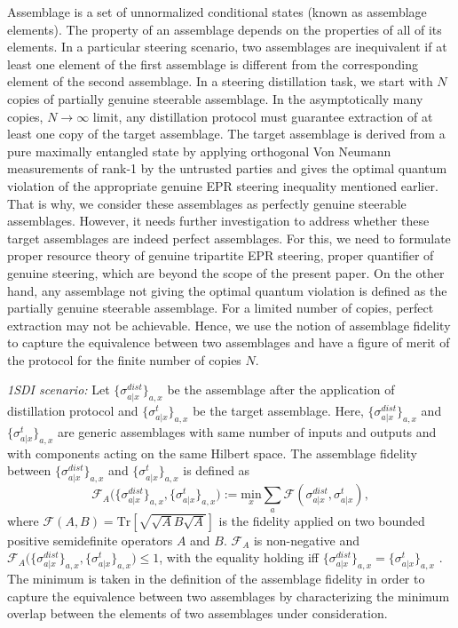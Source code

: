 \documentclass[reprint,superscriptaddress,nofootinbib,amsmath,amssymb,aps,pra,longbibliography]{revtex4-1}
\begin{document}
Assemblage is a set of unnormalized conditional states (known as assemblage elements). The property of an assemblage depends on the properties of all of its elements. In a particular steering scenario, two assemblages are inequivalent if at least one element of the first assemblage is different from the corresponding element of the second assemblage. In a steering distillation task, we start with $N$ copies of partially genuine steerable assemblage. In the asymptotically many copies, $N \rightarrow \infty$ limit, any distillation protocol must guarantee extraction of at least one copy of the target assemblage. The target assemblage is derived from a pure maximally entangled state by applying orthogonal Von Neumann measurements of rank-1 by the untrusted parties and gives the optimal quantum violation of the appropriate genuine EPR steering inequality mentioned earlier. That is why, we consider these assemblages as perfectly genuine steerable assemblages. However, it needs further investigation to address whether these target assemblages are indeed perfect assemblages. For this, we need to formulate proper resource theory of genuine tripartite EPR steering, proper quantifier of genuine steering, which are beyond the scope of the present paper. On the other hand, any assemblage not giving the optimal quantum violation is defined as the partially genuine steerable assemblage. For a limited number of copies, perfect extraction may not be achievable. Hence, we use the notion of assemblage fidelity \cite{Nery20} to capture the equivalence between two assemblages and have a figure of merit of the protocol for the finite number of copies $N$. 

\textit{1SDI scenario:} Let $\{\sigma_{a|x}^{dist} \}_{a,x}$ be the assemblage after the application of distillation protocol and  $\{\sigma_{a|x}^{t} \}_{a,x}$ be the target assemblage. Here, $\{\sigma_{a|x}^{dist} \}_{a,x}$ and $\{\sigma_{a|x}^{t} \}_{a,x}$ are generic assemblages with same number of inputs and outputs and with components acting on the same Hilbert space. The assemblage fidelity between $\{\sigma_{a|x}^{dist} \}_{a,x}$ and $\{\sigma_{a|x}^{t} \}_{a,x}$ is defined as \cite{Nery20}
\begin{equation}
	\mathcal{F}_A \Big(\{\sigma_{a|x}^{dist} \}_{a,x} , \{\sigma_{a|x}^{t} \}_{a,x} \Big):= \underset{x}{\mathrm{min}}\sum_{a} \mathcal{F}(\sigma_{a|x}^{dist}, \sigma_{a|x}^{t}) ,
\end{equation}
where $\mathcal{F}(A ,B) = \text{Tr}[\sqrt{\sqrt{A}B \sqrt{A}}]$ is the fidelity applied on two bounded positive semidefinite operators $A$ and $B$. $\mathcal{F}_A$ is non-negative and $\mathcal{F}_A \Big(\{\sigma_{a|x}^{dist} \}_{a,x} , \{\sigma_{a|x}^{t} \}_{a,x} \Big) \leq 1$, with the equality holding iff $\{\sigma_{a|x}^{dist} \}_{a,x} = \{\sigma_{a|x}^{t} \}_{a,x}$ \cite{Nery20}.  The minimum is taken in the definition of the assemblage fidelity in order to capture the equivalence between two assemblages by characterizing the minimum overlap between the elements of two assemblages under consideration.
\end{document}
